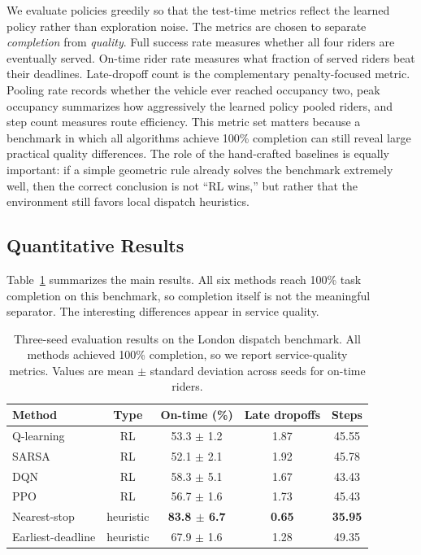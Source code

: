 \documentclass{article}
\begin{document}
We evaluate policies greedily so that the test-time metrics reflect the learned policy rather than exploration noise. The metrics are chosen to separate \emph{completion} from \emph{quality}. Full success rate measures whether all four riders are eventually served. On-time rider rate measures what fraction of served riders beat their deadlines. Late-dropoff count is the complementary penalty-focused metric. Pooling rate records whether the vehicle ever reached occupancy two, peak occupancy summarizes how aggressively the learned policy pooled riders, and step count measures route efficiency. This metric set matters because a benchmark in which all algorithms achieve 100\% completion can still reveal large practical quality differences. The role of the hand-crafted baselines is equally important: if a simple geometric rule already solves the benchmark extremely well, then the correct conclusion is not ``RL wins,'' but rather that the environment still favors local dispatch heuristics.

\subsection{Quantitative Results}
Table~\ref{tab:main-results} summarizes the main results. All six methods reach 100\% task completion on this benchmark, so completion itself is not the meaningful separator. The interesting differences appear in service quality.

\begin{table}[t]
    \centering
    \caption{Three-seed evaluation results on the London dispatch benchmark. All methods achieved 100\% completion, so we report service-quality metrics. Values are mean $\pm$ standard deviation across seeds for on-time riders.}
    \label{tab:main-results}
    \begin{tabular}{lcccc}
        \toprule
        Method & Type & On-time (\%) & Late dropoffs & Steps \\
        \midrule
        Q-learning & RL & 53.3 $\pm$ 1.2 & 1.87 & 45.55 \\
        SARSA & RL & 52.1 $\pm$ 2.1 & 1.92 & 45.78 \\
        DQN & RL & 58.3 $\pm$ 5.1 & 1.67 & 43.43 \\
        PPO & RL & 56.7 $\pm$ 1.6 & 1.73 & 45.43 \\
        Nearest-stop & heuristic & \textbf{83.8 $\pm$ 6.7} & \textbf{0.65} & \textbf{35.95} \\
        Earliest-deadline & heuristic & 67.9 $\pm$ 1.6 & 1.28 & 49.35 \\
        \bottomrule
    \end{tabular}
\end{table}
\end{document}
